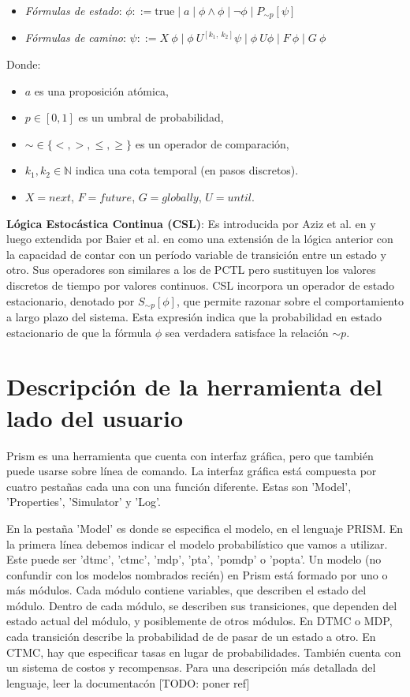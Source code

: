 \documentclass[runningheads]{llncs}
\begin{document}
\begin{itemize}
    \item \textit{Fórmulas de estado}: \( \phi ::= \text{true} \mid a \mid \phi \land \phi \mid \neg \phi \mid P_{\sim p}[\psi]\)
    \item \textit{Fórmulas de camino}: \(\psi ::= X\ \phi \mid \phi \ U^{[k_1,\ k_2]} \psi \mid \phi \ U \phi \mid F\ \phi \mid G\ \phi\)
\end{itemize}
Donde:
\begin{itemize}
    \item\(a\) es una proposición atómica,
    \item\(p \in [0,1]\) es un umbral de probabilidad,
    \item\(\sim \in \{<, >, \leq, \geq\}\) es un operador de comparación,
    \item\(k_1,k_2 \in \mathbb{N}\) indica una cota temporal (en pasos discretos).
    \item \(X=next\), \(F=future\), \(G=globally\), \(U=until\).
\end{itemize}

\textbf{Lógica Estocástica Continua (CSL)}: Es introducida por Aziz et al. en \cite{ASSB96} y luego extendida por Baier et al. en \cite{BKH99} como una extensión de la lógica anterior con la capacidad de contar con un período variable de transición entre un estado y otro. Sus operadores son similares a los de PCTL pero sustituyen los valores discretos de tiempo por valores continuos. CSL incorpora un operador de estado estacionario, denotado por $S_{\sim p}[\phi]$, que permite razonar sobre el comportamiento a largo plazo del sistema. Esta expresión indica que la probabilidad en estado estacionario de que la fórmula $\phi$ sea verdadera satisface la relación $\sim p$.

\section{Descripción de la herramienta del lado del usuario}

Prism es una herramienta que cuenta con interfaz gráfica, pero que también puede usarse sobre línea de comando. La interfaz gráfica está compuesta por cuatro pestañas cada una con una función diferente. Estas son 'Model', 'Properties', 'Simulator' y 'Log'.

En la pestaña 'Model' es donde se especifica el modelo, en el lenguaje PRISM. En la primera línea debemos indicar el modelo probabilístico que vamos a utilizar. Este puede ser 'dtmc', 'ctmc', 'mdp', 'pta', 'pomdp' o 'popta'. Un modelo (no confundir con los modelos nombrados recién) en Prism está formado por uno o más módulos. Cada módulo contiene variables, que describen el estado del módulo. Dentro de cada módulo, se describen sus transiciones, que dependen del estado actual del módulo, y posiblemente de otros módulos. En DTMC o MDP, cada transición describe la probabilidad de de pasar de un estado a otro. En CTMC, hay que especificar tasas en lugar de probabilidades. También cuenta con un sistema de costos y recompensas.
Para una descripción más detallada del lenguaje, leer la documentacón [TODO: poner ref]
\end{document}

